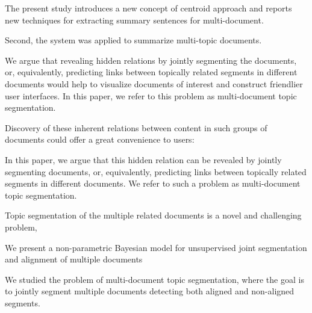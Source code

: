 









The present study introduces a new concept of centroid approach and reports new techniques for extracting summary sentences for multi-document.


Second, the system was applied to summarize multi-topic documents.











We argue that revealing hidden
relations by jointly segmenting the documents, or, equivalently, 
predicting links between topically related segments in
different documents would help to visualize documents of interest 
and construct friendlier user interfaces. In this paper,
we refer to this problem as multi-document topic segmentation.




Discovery of these inherent relations between content in such
groups of documents could offer a great convenience to users:


In this paper, we argue that this hidden relation 
can be revealed by jointly segmenting documents, or,
equivalently, predicting links between topically related segments 
in different documents. We refer to such a problem
as multi-document topic segmentation.



Topic segmentation of the multiple related documents is
a novel and challenging problem,


We present a non-parametric Bayesian model for unsupervised 
joint segmentation and alignment of multiple documents


We studied the problem of multi-document topic segmentation, 
where the goal is to jointly segment multiple documents 
detecting both aligned and non-aligned segments.




